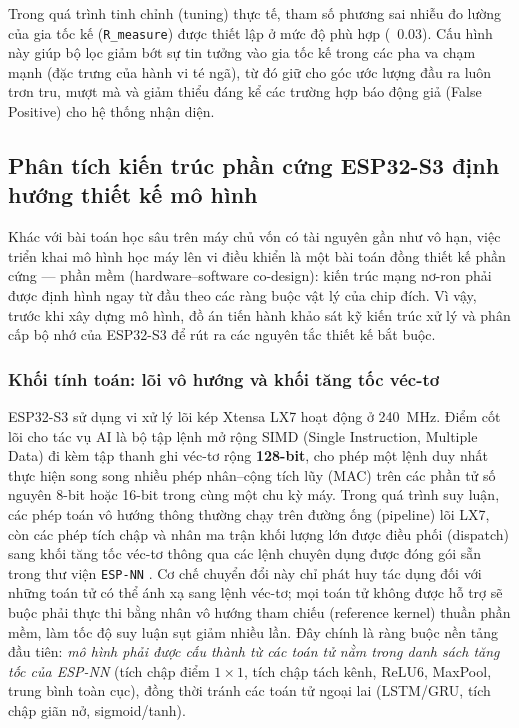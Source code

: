 \documentclass[../DoAn.tex]{subfiles}
\begin{document}
Trong quá trình tinh chỉnh (tuning) thực tế, tham số phương sai nhiễu đo lường của gia tốc kế (\texttt{R\_measure}) được thiết lập ở mức độ phù hợp (~0.03). Cấu hình này giúp bộ lọc giảm bớt sự tin tưởng vào gia tốc kế trong các pha va chạm mạnh (đặc trưng của hành vi té ngã), từ đó giữ cho góc ước lượng đầu ra luôn trơn tru, mượt mà và giảm thiểu đáng kể các trường hợp báo động giả (False Positive) cho hệ thống nhận diện.

\subsection{Phân tích kiến trúc phần cứng ESP32-S3 định hướng thiết kế mô hình}
Khác với bài toán học sâu trên máy chủ vốn có tài nguyên gần như vô hạn, việc triển khai mô hình học máy lên vi điều khiển là một bài toán đồng thiết kế phần cứng --- phần mềm (hardware--software co-design): kiến trúc mạng nơ-ron phải được định hình ngay từ đầu theo các ràng buộc vật lý của chip đích. Vì vậy, trước khi xây dựng mô hình, đồ án tiến hành khảo sát kỹ kiến trúc xử lý và phân cấp bộ nhớ của ESP32-S3 \cite{espressif2023esp32s3, espressif2023esp32s3trm} để rút ra các nguyên tắc thiết kế bắt buộc.

\subsubsection{Khối tính toán: lõi vô hướng và khối tăng tốc véc-tơ}
ESP32-S3 sử dụng vi xử lý lõi kép Xtensa LX7 hoạt động ở 240~MHz. Điểm cốt lõi cho tác vụ AI là bộ tập lệnh mở rộng SIMD (Single Instruction, Multiple Data) đi kèm tập thanh ghi véc-tơ rộng \textbf{128-bit}, cho phép một lệnh duy nhất thực hiện song song nhiều phép nhân--cộng tích lũy (MAC) trên các phần tử số nguyên 8-bit hoặc 16-bit trong cùng một chu kỳ máy. Trong quá trình suy luận, các phép toán vô hướng thông thường chạy trên đường ống (pipeline) lõi LX7, còn các phép tích chập và nhân ma trận khối lượng lớn được điều phối (dispatch) sang khối tăng tốc véc-tơ thông qua các lệnh chuyên dụng được đóng gói sẵn trong thư viện \texttt{ESP-NN} \cite{espressif2023espnn}. Cơ chế chuyển đổi này chỉ phát huy tác dụng đối với những toán tử có thể ánh xạ sang lệnh véc-tơ; mọi toán tử không được hỗ trợ sẽ buộc phải thực thi bằng nhân vô hướng tham chiếu (reference kernel) thuần phần mềm, làm tốc độ suy luận sụt giảm nhiều lần. Đây chính là ràng buộc nền tảng đầu tiên: \textit{mô hình phải được cấu thành từ các toán tử nằm trong danh sách tăng tốc của ESP-NN} (tích chập điểm $1\times1$, tích chập tách kênh, ReLU6, MaxPool, trung bình toàn cục), đồng thời tránh các toán tử ngoại lai (LSTM/GRU, tích chập giãn nở, sigmoid/tanh).
\end{document}
